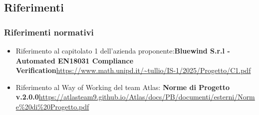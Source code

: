 \documentclass[a4paper,12pt]{article}
\begin{document}
    \subsection{Riferimenti}
        \subsubsection{Riferimenti normativi}
            \begin{itemize}
                \item Riferimento al capitolato 1 dell'azienda proponente:\newline \textbf{Bluewind S.r.l - Automated EN18031 Compliance Verification}\newline \url{https://www.math.unipd.it/~tullio/IS-1/2025/Progetto/C1.pdf}
                \item Riferimento al Way of Working del team Atlas: \newline \textbf{Norme di Progetto v.2.0.0}\newline \url{https://atlasteam9.github.io/Atlas/docs/PB/documenti/esterni/Norme%20di%20Progetto.pdf}
            \end{itemize}
        
\end{document}
